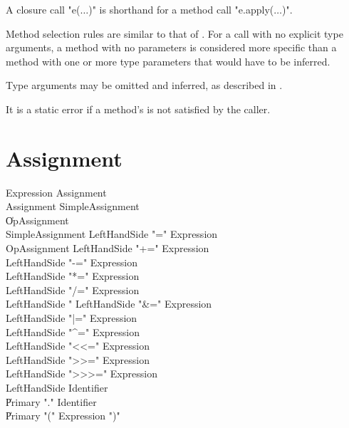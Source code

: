 A closure call \xcdmath"e($\dots$)" is shorthand for a method call \xcdmath"e.apply($\dots$)".

Method selection rules are similar to that of \java{}.
For a call with no explicit type arguments, a method with 
no parameters is considered more specific than a method with one or more
type parameters that would have to be inferred.

Type arguments may be omitted and inferred, as described in
.

It is a static error if a method's  is not satisfied by the caller.

\section{Assignment}\label{AssignmentStatement}

\begin{grammar}
Expression \: Assignment \\
Assignment \: SimpleAssignment \\
           \| OpAssignment \\
SimpleAssignment \: LeftHandSide \xcd"=" Expression \\
OpAssignment \: LeftHandSide \xcd"+=" Expression \\
             \: LeftHandSide \xcd"-=" Expression \\
             \: LeftHandSide \xcd"*=" Expression \\
             \: LeftHandSide \xcd"/=" Expression \\
             \: LeftHandSide \xcd"%
             \: LeftHandSide \xcd"&=" Expression \\
             \: LeftHandSide \xcd"|=" Expression \\
             \: LeftHandSide \xcd"^=" Expression \\
             \: LeftHandSide \xcd"<<=" Expression \\
             \: LeftHandSide \xcd">>=" Expression \\
             \: LeftHandSide \xcd">>>=" Expression \\
LeftHandSide \: Identifier \\
             \| Primary \xcd"." Identifier \\
             \| Primary \xcd"(" Expression \xcd")" \\
\end{grammar}


